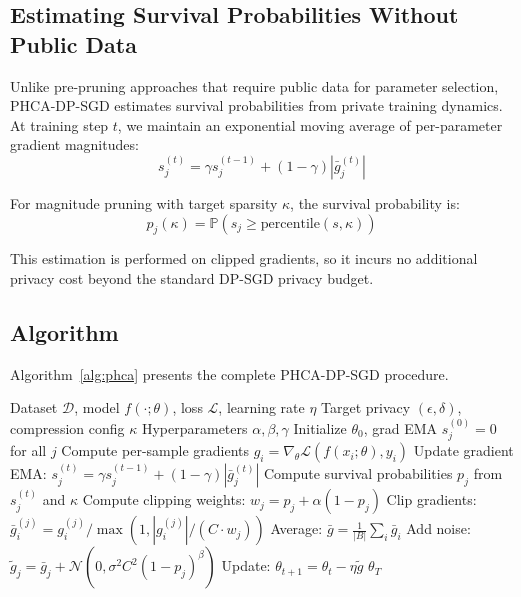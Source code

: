 \documentclass[11pt,a4paper]{article}
\begin{document}
\subsection{Estimating Survival Probabilities Without Public Data}

Unlike pre-pruning approaches that require public data for parameter selection, PHCA-DP-SGD estimates survival probabilities from private training dynamics. At training step $t$, we maintain an exponential moving average of per-parameter gradient magnitudes:
\begin{equation}
s_j^{(t)} = \gamma s_j^{(t-1)} + (1-\gamma) |\bar{g}_j^{(t)}|
\end{equation}

For magnitude pruning with target sparsity $\kappa$, the survival probability is:
\begin{equation}
p_j(\kappa) = \mathbb{P}(s_j \geq \text{percentile}(s, \kappa))
\end{equation}

This estimation is performed on clipped gradients, so it incurs no additional privacy cost beyond the standard DP-SGD privacy budget.

\subsection{Algorithm}

Algorithm~\ref{alg:phca} presents the complete PHCA-DP-SGD procedure.

\begin{algorithm}[t]
\caption{PHCA-DP-SGD}
\label{alg:phca}
\begin{algorithmic}[1]
\Require Dataset $\mathcal{D}$, model $f(\cdot; \theta)$, loss $\mathcal{L}$, learning rate $\eta$
\Require Target privacy $(\epsilon, \delta)$, compression config $\kappa$
\Require Hyperparameters $\alpha, \beta, \gamma$
\State Initialize $\theta_0$, grad EMA $s_j^{(0)} = 0$ for all $j$
        \State Compute per-sample gradients $g_i = \nabla_\theta \mathcal{L}(f(x_i; \theta), y_i)$
        \State Update gradient EMA: $s_j^{(t)} = \gamma s_j^{(t-1)} + (1-\gamma) |\bar{g}_j^{(t)}|$
        \State Compute survival probabilities $p_j$ from $s_j^{(t)}$ and $\kappa$
        \State Compute clipping weights: $w_j = p_j + \alpha(1 - p_j)$
        \State Clip gradients: $\bar{g}_i^{(j)} = g_i^{(j)} / \max(1, |g_i^{(j)}| / (C \cdot w_j))$
        \State Average: $\bar{g} = \frac{1}{|B|} \sum_i \bar{g}_i$
        \State Add noise: $\tilde{g}_j = \bar{g}_j + \mathcal{N}(0, \sigma^2 C^2 (1-p_j)^\beta)$
        \State Update: $\theta_{t+1} = \theta_t - \eta \tilde{g}$
    \EndFor
\EndFor
\State \Return $\theta_T$
\end{algorithmic}
\end{algorithm}
\end{document}

